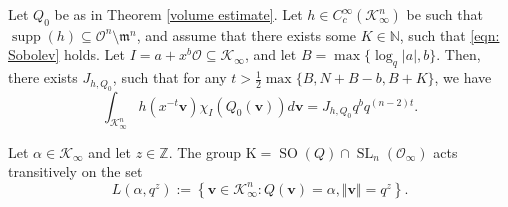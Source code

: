 \documentclass[10pt,a4paper]{amsart}
\begin{document}
\begin{theorem}
\label{thm:VolR=0}
    Let $Q_0$ be as in Theorem \ref{volume estimate}. Let $h\in C_c^{\infty}(\mathcal{K}_{\infty}^n)$ be such that $\operatorname{supp}(h)\subseteq \mathcal{O}^n\setminus \mathfrak{m}^n$, and assume that there exists some $K\in \mathbb{N}$, such that \eqref{eqn: Sobolev} holds. Let $I=a+x^{b}\mathcal{O}\subseteq \mathcal{K}_{\infty}$, and let $B=\max\{\log_q\vert a\vert,b\}$. Then, there exists $J_{h,Q_0}$, such that for any $t>\frac{1}{2}\max\{B,N+B-b,B+K\}$, we have
    $$\int_{\mathcal{K}_{\infty}^n}h(x^{-t}\mathbf{v})\chi_I(Q_0(\mathbf{v}))d\mathbf{v}=J_{h,Q_0}q^bq^{(n-2)t}.$$
\end{theorem}

\begin{theorem}\label{thm: Witt}
    Let $\alpha\in \mathcal{K}_{\infty}$ and let $z\in\mathbb{Z}$. The group $\mathrm{K}=\operatorname{SO}(Q)\cap \operatorname{SL}_n(\mathcal{O}_{\infty})$ acts transitively on the set
    $$L(\alpha,q^z):=\left\{\mathbf{v}\in \mathcal{K}_{\infty}^n:Q(\mathbf{v})=\alpha,\Vert \mathbf{v}\Vert=q^z\right\}.$$
\end{theorem}
\end{document}
